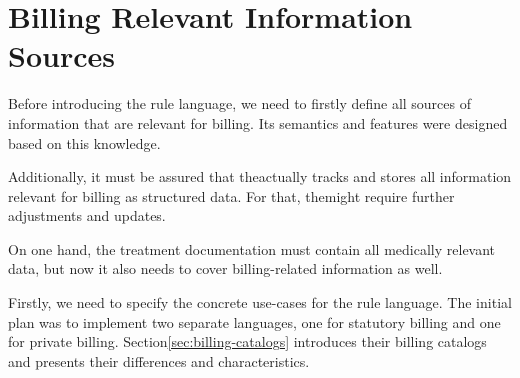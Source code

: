 \section{Billing Relevant Information Sources}\label{sec:billing-relevant-information-sources}


Before introducing the rule language,
we need to firstly define all sources of information that are relevant for billing.
Its semantics and features were designed based on this knowledge.

Additionally,
it must be assured that the\AVS actually tracks and stores all information relevant for billing as structured data.
For that, the\AVS might require further adjustments and updates.

On one hand, the treatment documentation must contain all medically relevant data,
but now it also needs to cover billing-related information as well.



Firstly, we need to specify the concrete use-cases for the rule language.
The initial plan was to implement two separate languages, one for statutory billing and one for private billing.
Section\ref{sec:billing-catalogs} introduces their billing catalogs and presents their differences and characteristics.

